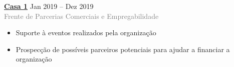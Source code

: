 \documentclass[9pt]{developercv} %
\begin{document}
\hfill
\begin{minipage}[t]{0.3\textwidth}
	\vspace{-\baselineskip} %


	\textbf{\textcolor{bleu_cite}{\href{https://www.casaum.org/}{Casa 1}} } \hspace{1.cm} Jan 2019 --  Dez 2019\\
	\textcolor{gray}{Frente de Parcerias Comerciais e Empregabilidade}
	\begin{itemize}
		\item Suporte à eventos realizados pela organização
		\item Prospecção de possíveis parceiros potenciais para ajudar a financiar a organização
	\end{itemize}
\end{minipage}


\end{document}
